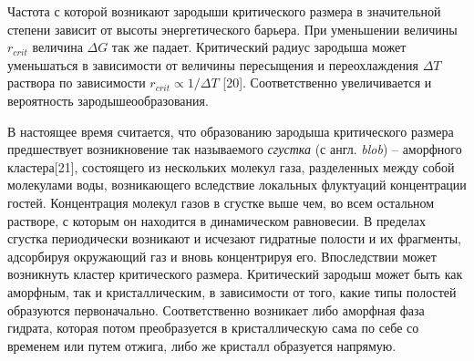 Частота с которой возникают зародыши критического размера в значительной степени зависит от высоты энергетического барьера. При уменьшении величины $r_{crit}$ величина $\Delta G$ так же падает. Критический радиус зародыша может уменьшаться в зависимости от величины пересыщения и переохлаждения $\Delta T$ раствора по зависимости $r_{crit} \propto 1/\Delta T$ [20]. Соответственно увеличивается и вероятность зародышеообразования. 

В настоящее время считается, что образованию зародыша критического размера предшествует возникновение так называемого \textit{сгустка} (с англ. \textit{blob}) -- аморфного кластера[21], состоящего из нескольких молекул газа, разделенных между собой молекулами воды, возникающего вследствие локальных флуктуаций концентрации гостей. Концентрация молекул газов в сгустке выше чем, во всем остальном растворе, с которым он находится в динамическом равновесии. В пределах сгустка периодически возникают и исчезают гидратные полости и их фрагменты, адсорбируя окружающий газ и вновь концентрируя его. Впоследствии может возникнуть кластер критического размера. Критический зародыш может быть как аморфным, так и кристаллическим, в зависимости от того, какие типы полостей образуются первоначально. Соответственно возникает либо аморфная фаза гидрата, которая потом преобразуется в кристаллическую сама по себе со временем или путем отжига, либо же кристалл образуется напрямую.